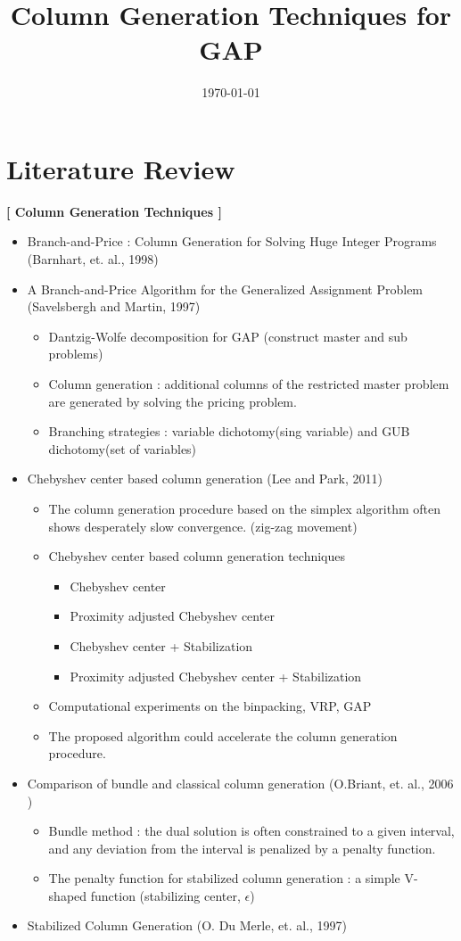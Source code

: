 \documentclass[12pt]{article}
\begin{document}
	\title{Column Generation Techniques for GAP}
	\author{}
	\date{\today}
	\maketitle
	
	\section{Literature Review}
	
	\textbf{[ Column Generation Techniques ]}
	\begin{itemize}
		\item Branch-and-Price : Column Generation for Solving Huge Integer Programs (Barnhart, et. al., 1998)
		\item A Branch-and-Price Algorithm for the Generalized Assignment Problem (Savelsbergh and Martin, 1997) 
		\begin{itemize}
			\item Dantzig-Wolfe decomposition for GAP (construct master and sub problems)
			\item Column generation : additional columns of the restricted master problem are generated by solving the pricing problem.
			\item Branching strategies : variable dichotomy(sing variable) and GUB dichotomy(set of variables)
		\end{itemize}
		\item Chebyshev center based column generation (Lee and Park, 2011)
		\begin{itemize}
			\item The column generation procedure based on the simplex algorithm often shows desperately slow convergence. (zig-zag movement)
			\item Chebyshev center based column generation techniques
			\begin{itemize}
				\item Chebyshev center 
				\item Proximity adjusted Chebyshev center
				\item Chebyshev center + Stabilization
				\item Proximity adjusted Chebyshev center + Stabilization
			\end{itemize}
			\item Computational experiments on the binpacking, VRP, GAP
			\item The proposed algorithm could accelerate the column generation procedure.
		\end{itemize}
		\item Comparison of bundle and classical column generation (O.Briant, et. al., 2006 )
		\begin{itemize}
			\item Bundle method : the dual solution is often constrained to a given interval, and any deviation from the interval is penalized by a penalty function.
			\item The penalty function for stabilized column generation  : a simple V-shaped function (stabilizing center, $\epsilon$)
		\end{itemize}
		\item Stabilized Column Generation (O. Du Merle, et. al., 1997)
	\end{itemize}
\end{document}
